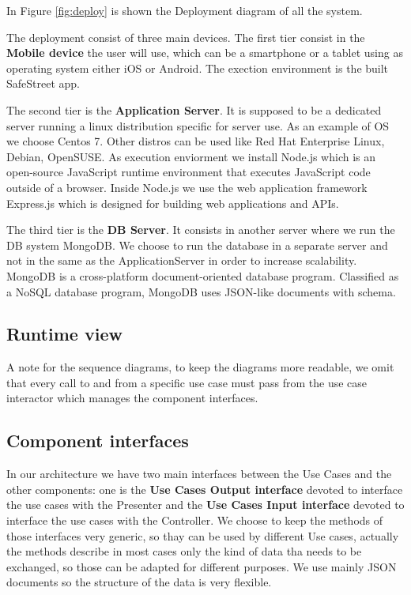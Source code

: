 In Figure \ref{fig:deploy} is shown the Deployment diagram of all the system.

The deployment consist of three main devices. The first tier consist in the \textbf{Mobile device} the user will use, which can be a smartphone or a tablet using as operating system either iOS or Android.
The exection environment is the built SafeStreet app.


The second tier is the \textbf{Application Server}. It is supposed to be a dedicated server running a linux distribution specific for server use. As an example of OS we choose Centos 7. Other distros can be used like Red Hat Enterprise Linux, Debian, OpenSUSE.
As execution enviorment we install Node.js which is an open-source JavaScript runtime environment that executes JavaScript code outside of a browser. Inside Node.js we use the web application framework Express.js which is designed for building web applications and APIs.

The third tier is the \textbf{DB Server}. It consists in another server where we run the DB system MongoDB. We choose to run the database in a separate server and not in the same as the ApplicationServer in order to increase scalability. MongoDB is a cross-platform document-oriented database program. Classified as a NoSQL database program, MongoDB uses JSON-like documents with schema.

\subsection{Runtime view}
A note for the sequence diagrams, to keep the diagrams more readable, we omit that every call to and from a specific use case must pass from the use case interactor which manages the component interfaces.
 \label{sequencespart}

\subsection{Component interfaces}
In our architecture we have two main interfaces between the Use Cases and the other components: one is the \textbf{Use Cases Output interface} devoted to interface the use cases with the Presenter and the \textbf{Use Cases Input interface} devoted to interface the use cases with the Controller.
We choose to keep the methods of those interfaces very generic, so thay can be used by different Use cases, actually the methods describe in most cases only the kind of data tha needs to be exchanged, so those can be adapted for different purposes. We use mainly JSON documents so the structure of the data is very flexible.

